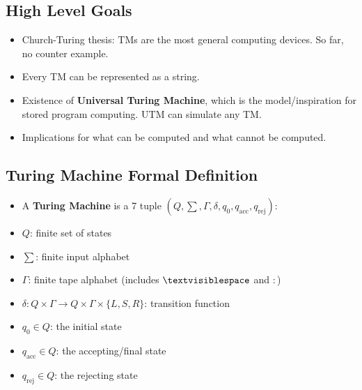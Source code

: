 \documentclass[12pt]{article}
\begin{document}
\subsection{High Level Goals}
\begin{itemize}
    \item Church-Turing thesis: TMs are the most general computing devices. So far, no counter example.
    \item Every TM can be represented as a string.
    \item Existence of \textbf{Universal Turing Machine}, which is the model/inspiration for stored program computing. UTM can simulate any TM.
    \item Implications for what can be computed and what cannot be computed.
\end{itemize}

\subsection{Turing Machine Formal Definition}
\begin{itemize}
    \item A \textbf{Turing Machine} is a 7 tuple $(Q, \sum, \Gamma, \delta, q_0, q_{\text{acc}}, q_{\text{rej}})$:
    \item $Q$: finite set of states
    \item $\sum$: finite input alphabet
    \item $\Gamma$: finite tape alphabet (includes $\textvisiblespace$ and $:$)
    \item $\delta: Q \times \Gamma \rightarrow Q \times \Gamma \times \{ L, S, R \}$: transition function
    \item $q_0 \in Q$: the initial state
    \item $q_{\text{acc}} \in Q$: the accepting/final state
    \item $q_{\text{rej}} \in Q$: the rejecting state
\end{itemize}
\end{document}
